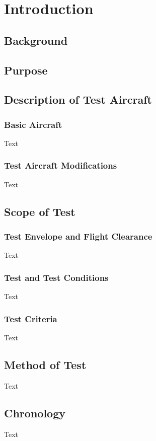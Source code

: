 \chapter{Introduction}\label{ch:Introduction}

\section{Background}\label{sec:Background}
\p \blindtext \pp \label{par:Background}

\section{Purpose}\label{sec:Purpose}
\p \blindtext \pp \label{par:Purpose}

\section{Description of Test Aircraft}\label{sec:Description}

\subsection{Basic Aircraft}\label{subsec:Aircraft}
\p Text \pp \label{par:BasicAircraft}

\subsection{Test Aircraft Modifications}\label{subsec:TestAircraft}
\p Text \pp \label{par:TestAircraft}

\section{Scope of Test}\label{sec:Scope}
\subsection{Test Envelope and Flight Clearance}\label{subsec:TestEnvelope}
\p Text \pp \label{par:TestEnvelope}

\subsection{Test and Test Conditions}\label{subsec:TestConditions}
\p Text \pp \label{par:TestConditions}

\subsection{Test Criteria}\label{subsec:TestCriteria}
\p Text \pp \label{par:TestCriteria}

\section{Method of Test}\label{sec:MethodTest}
\p Text \pp \label{par:MethodTest}

\section{Chronology}\label{sec:Chronology}
\p Text \pp \label{par:Chronology}

\pagebreak

